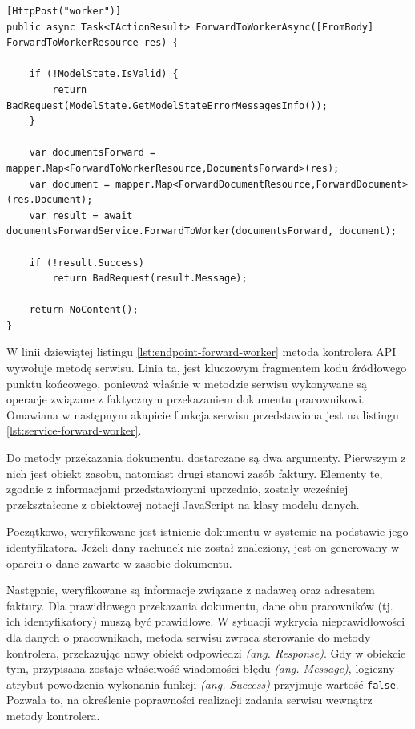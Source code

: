 \begin{lstlisting}[label=lst:endpoint-forward-worker,caption=Kod metody punktu końcowego przekazywania dokumentów pracownikowi, captionpos=b,basicstyle=\footnotesize\ttfamily,style=sharpcstyle,language={[Sharp]C}]
[HttpPost("worker")]
public async Task<IActionResult> ForwardToWorkerAsync([FromBody] ForwardToWorkerResource res) {
	
	if (!ModelState.IsValid) {
		return BadRequest(ModelState.GetModelStateErrorMessagesInfo());
	}
	
	var documentsForward = mapper.Map<ForwardToWorkerResource,DocumentsForward>(res);
	var document = mapper.Map<ForwardDocumentResource,ForwardDocument>(res.Document);
	var result = await documentsForwardService.ForwardToWorker(documentsForward, document);
	
	if (!result.Success)
		return BadRequest(result.Message);
		
	return NoContent();
}
\end{lstlisting}

W linii dziewiątej listingu \ref{lst:endpoint-forward-worker} metoda kontrolera API wywołuje metodę serwisu. Linia ta, jest kluczowym fragmentem kodu źródłowego punktu końcowego, ponieważ właśnie w metodzie serwisu wykonywane są operacje związane z faktycznym przekazaniem dokumentu pracownikowi. Omawiana w następnym akapicie funkcja serwisu przedstawiona jest na listingu \ref{lst:service-forward-worker}.

Do metody przekazania dokumentu, dostarczane są dwa argumenty. Pierwszym z nich jest obiekt zasobu, natomiast drugi stanowi zasób faktury. Elementy te, zgodnie z informacjami przedstawionymi uprzednio, zostały wcześniej przekształcone z obiektowej notacji JavaScript na klasy modelu danych.

Początkowo, weryfikowane jest istnienie dokumentu w systemie na podstawie jego identyfikatora. Jeżeli dany rachunek nie został znaleziony, jest on generowany w oparciu o dane zawarte w zasobie dokumentu.

Następnie, weryfikowane są informacje związane z nadawcą oraz adresatem faktury. Dla prawidłowego przekazania dokumentu, dane obu pracowników (tj. ich identyfikatory) muszą być prawidłowe. W sytuacji wykrycia nieprawidłowości dla danych o pracownikach, metoda serwisu zwraca sterowanie do metody kontrolera, przekazując nowy obiekt odpowiedzi \textit{(ang. Response)}. Gdy w obiekcie tym, przypisana zostaje właściwość wiadomości błędu \textit{(ang. Message)}, logiczny atrybut powodzenia wykonania funkcji \textit{(ang. Success)} przyjmuje wartość \texttt{false}. Pozwala to, na określenie poprawności realizacji zadania serwisu wewnątrz metody kontrolera.

